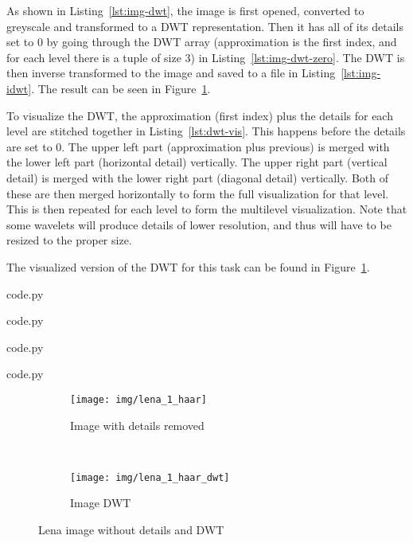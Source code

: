 As shown in Listing~\ref{lst:img-dwt}, the image is first opened, converted to greyscale and transformed to a DWT representation.
Then it has all of its details set to 0 by going through the DWT array (approximation is the first index, and for each level there is a tuple of size 3) in Listing~\ref{lst:img-dwt-zero}.
The DWT is then inverse transformed to the image and saved to a file in Listing~\ref{lst:img-idwt}.
The result can be seen in Figure~\ref{fig:task3}.

To visualize the DWT, the approximation (first index) plus the details for each level are stitched together in Listing~\ref{lst:dwt-vis}.
This happens before the details are set to 0.
The upper left part (approximation plus previous) is merged with the lower left part (horizontal detail) vertically.
The upper right part (vertical detail) is merged with the lower right part (diagonal detail) vertically.
Both of these are then merged horizontally to form the full visualization for that level.
This is then repeated for each level to form the multilevel visualization.
Note that some wavelets will produce details of lower resolution, and thus will have to be resized to the proper size.

The visualized version of the DWT for this task can be found in Figure~\ref{fig:task3}.


  {code.py}


  {code.py}


  {code.py}


  {code.py}

\begin{figure}[H]
  \centering
  \begin{subfigure}[t]{0.5\textwidth}
    \centering
    \texttt{[image: img/lena\_1\_haar]}
    \caption{Image with details removed}
  \end{subfigure}%
  ~
  \begin{subfigure}[t]{0.5\textwidth}
    \centering
    \texttt{[image: img/lena\_1\_haar\_dwt]}
    \caption{Image DWT}
  \end{subfigure}%
  \caption{Lena image without details and DWT}
  \label{fig:task3}
\end{figure}


